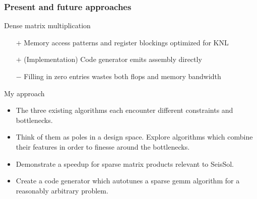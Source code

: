 \documentclass[9pt]{beamer}
\begin{document}
\begin{frame}
  \frametitle{Present and future approaches}
  \begin{block}{Dense matrix multiplication}
    \begin{itemize}
    \item[$+$] Memory access patterns and register blockings optimized for KNL
    \item[$+$] (Implementation) Code generator emits assembly directly 
    \item[$-$] Filling in zero entries wastes both flops and memory bandwidth
    \end{itemize}
  \end{block}

  \begin{block}{My approach}
    \begin{itemize}
    \item The three existing algorithms each encounter different constraints and bottlenecks.
    \item Think of them as poles in a design space. Explore algorithms which combine their features in order to finesse around the bottlenecks.
    \item Demonstrate a speedup for sparse matrix products relevant to SeisSol.
    \item Create a code generator which autotunes a sparse gemm algorithm for a reasonably arbitrary problem.
    \end{itemize}
  \end{block}
\end{frame}
\end{document}
